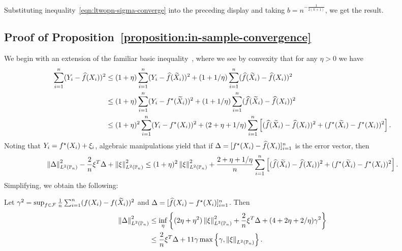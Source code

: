 Substituting inequality~\eqref{eqn:ltwopn-sigma-converge} into
the preceding display and taking $b = n^{-\frac{1}{2(k + 1)}}$, we
get the result.

\subsection{Proof of Proposition~\ref{proposition:in-sample-convergence}}
\label{sec:proof-in-sample-convergence}

We begin with an extension of the
familiar basic inequality~\cite[e.g.][Eq.~(13.18)]{Wainwright19}, where
we see by convexity that for any $\eta > 0$ we have
\begin{align*}
  \sum_{i = 1}^n (Y_i - \widehat{f}(X_i))^2
  & \le (1 + \eta) \sum_{i = 1}^n (Y_i - \widehat{f}(\widetilde{X}_i))^2
  + (1 + 1/\eta) \sum_{i = 1}^n (\widehat{f}(\widetilde{X}_i) - \widehat{f}(X_i))^2 \\
  & \le (1 + \eta) \sum_{i = 1}^n (Y_i - f^\star(\widetilde{X}_i))^2
  + (1 + 1/\eta) \sum_{i = 1}^n (\widehat{f}(\widetilde{X}_i) - \widehat{f}(X_i))^2 \\
  & \le (1 + \eta)^2 \sum_{i = 1}^n (Y_i - f^\star(X_i))^2
  + (2 + \eta + 1/\eta) \sum_{i = 1}^n
  \left[(\widehat{f}(\widetilde{X}_i) - \widehat{f}(X_i))^2
    + (f^\star(\widetilde{X}_i) - f^\star(X_i))^2 \right].
\end{align*}
Noting that $Y_i = f^\star(X_i) + \xi_i$, algebraic manipulations yield
that if
$\Delta = [f^\star(X_i) - \widehat{f}(X_i)]_{i = 1}^n$ is the error vector, then
\begin{equation*}
  \left\|{\Delta}\right\|_{L^2(\mathbb{P}_n)}^2 - \frac{2}{n} \xi^T \Delta
  + \left\|{\xi}\right\|_{L^2(\mathbb{P}_n)}^2 \le
  (1 + \eta)^2 \left\|{\xi}\right\|_{L^2(\mathbb{P}_n)}^2
  + \frac{2 + \eta + 1/\eta}{n} \sum_{i = 1}^n
  \left[(\widehat{f}(\widetilde{X}_i) - \widehat{f}(X_i))^2
    + (f^\star(\widetilde{X}_i) - f^\star(X_i))^2 \right].
\end{equation*}
Simplifying, we obtain the following:
\begin{lemma}
  \label{lemma:basic-inequality}
  Let $\gamma^2 = \sup_{f \in \mathcal{F}}
  \frac{1}{n} \sum_{i = 1}^n (f(X_i) - f(\widetilde{X}_i))^2$
  and $\Delta = [\widehat{f}(X_i) - f^\star(X_i)]_{i = 1}^n$.
  Then
  \begin{align*}
    \left\|{\Delta}\right\|_{L^2(\mathbb{P}_n)}^2
    & \le \inf_\eta \left\{(2 \eta + \eta^2) \left\|{\xi}\right\|_{L^2(\mathbb{P}_n)}^2
    + \frac{2}{n} \xi^T \Delta
    + (4 + 2 \eta + 2/\eta) \gamma^2 \right\} \\
    & \le \frac{2}{n} \xi^T \Delta
    + 11 \gamma \max\left\{\gamma, \left\|{\xi}\right\|_{L^2(\mathbb{P}_n)}\right\}.
  \end{align*}
\end{lemma}
